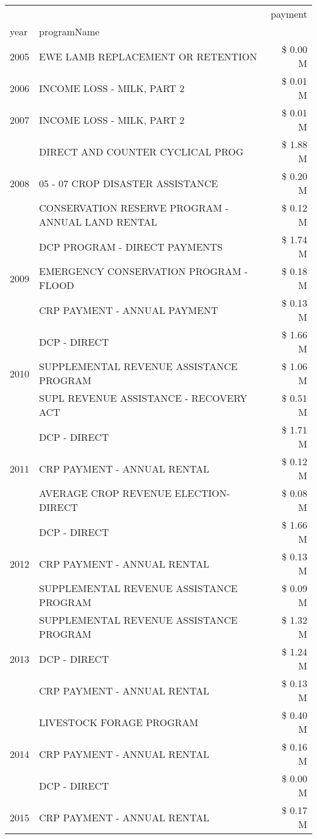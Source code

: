 \begin{tabular}{llr}
\toprule
 &  & payment \\
year & programName &  \\
\midrule
2005 & EWE LAMB REPLACEMENT OR RETENTION & \$ 0.00 M \\
\cline{1-3}
2006 & INCOME LOSS - MILK, PART 2 & \$ 0.01 M \\
\cline{1-3}
2007 & INCOME LOSS - MILK, PART 2 & \$ 0.01 M \\
\cline{1-3}
\multirow[t]{3}{*}{2008} & DIRECT AND COUNTER CYCLICAL PROG & \$ 1.88 M \\
 & 05 - 07 CROP DISASTER ASSISTANCE & \$ 0.20 M \\
 & CONSERVATION RESERVE PROGRAM - ANNUAL LAND RENTAL & \$ 0.12 M \\
\cline{1-3}
\multirow[t]{3}{*}{2009} & DCP PROGRAM - DIRECT PAYMENTS & \$ 1.74 M \\
 & EMERGENCY CONSERVATION PROGRAM - FLOOD & \$ 0.18 M \\
 & CRP PAYMENT - ANNUAL PAYMENT & \$ 0.13 M \\
\cline{1-3}
\multirow[t]{3}{*}{2010} & DCP - DIRECT & \$ 1.66 M \\
 & SUPPLEMENTAL REVENUE ASSISTANCE PROGRAM & \$ 1.06 M \\
 & SUPL REVENUE ASSISTANCE - RECOVERY ACT & \$ 0.51 M \\
\cline{1-3}
\multirow[t]{3}{*}{2011} & DCP - DIRECT & \$ 1.71 M \\
 & CRP PAYMENT - ANNUAL RENTAL & \$ 0.12 M \\
 & AVERAGE CROP REVENUE ELECTION-DIRECT & \$ 0.08 M \\
\cline{1-3}
\multirow[t]{3}{*}{2012} & DCP - DIRECT & \$ 1.66 M \\
 & CRP PAYMENT - ANNUAL RENTAL & \$ 0.13 M \\
 & SUPPLEMENTAL REVENUE ASSISTANCE PROGRAM & \$ 0.09 M \\
\cline{1-3}
\multirow[t]{3}{*}{2013} & SUPPLEMENTAL REVENUE ASSISTANCE PROGRAM & \$ 1.32 M \\
 & DCP - DIRECT & \$ 1.24 M \\
 & CRP PAYMENT - ANNUAL RENTAL & \$ 0.13 M \\
\cline{1-3}
\multirow[t]{3}{*}{2014} & LIVESTOCK FORAGE PROGRAM & \$ 0.40 M \\
 & CRP PAYMENT - ANNUAL RENTAL & \$ 0.16 M \\
 & DCP - DIRECT & \$ 0.00 M \\
\cline{1-3}
\multirow[t]{3}{*}{2015} & CRP PAYMENT - ANNUAL RENTAL & \$ 0.17 M \\

\end{tabular}
